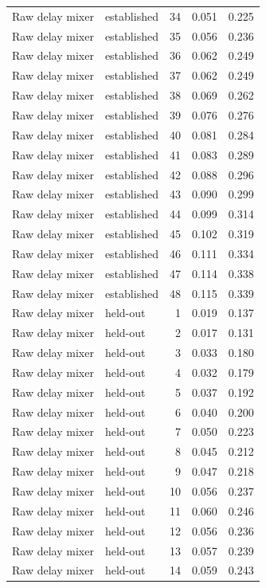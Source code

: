 \begin{tabular}{llrrr}
Raw delay mixer & established & 34 & 0.051 & 0.225 \\
Raw delay mixer & established & 35 & 0.056 & 0.236 \\
Raw delay mixer & established & 36 & 0.062 & 0.249 \\
Raw delay mixer & established & 37 & 0.062 & 0.249 \\
Raw delay mixer & established & 38 & 0.069 & 0.262 \\
Raw delay mixer & established & 39 & 0.076 & 0.276 \\
Raw delay mixer & established & 40 & 0.081 & 0.284 \\
Raw delay mixer & established & 41 & 0.083 & 0.289 \\
Raw delay mixer & established & 42 & 0.088 & 0.296 \\
Raw delay mixer & established & 43 & 0.090 & 0.299 \\
Raw delay mixer & established & 44 & 0.099 & 0.314 \\
Raw delay mixer & established & 45 & 0.102 & 0.319 \\
Raw delay mixer & established & 46 & 0.111 & 0.334 \\
Raw delay mixer & established & 47 & 0.114 & 0.338 \\
Raw delay mixer & established & 48 & 0.115 & 0.339 \\
Raw delay mixer & held-out & 1 & 0.019 & 0.137 \\
Raw delay mixer & held-out & 2 & 0.017 & 0.131 \\
Raw delay mixer & held-out & 3 & 0.033 & 0.180 \\
Raw delay mixer & held-out & 4 & 0.032 & 0.179 \\
Raw delay mixer & held-out & 5 & 0.037 & 0.192 \\
Raw delay mixer & held-out & 6 & 0.040 & 0.200 \\
Raw delay mixer & held-out & 7 & 0.050 & 0.223 \\
Raw delay mixer & held-out & 8 & 0.045 & 0.212 \\
Raw delay mixer & held-out & 9 & 0.047 & 0.218 \\
Raw delay mixer & held-out & 10 & 0.056 & 0.237 \\
Raw delay mixer & held-out & 11 & 0.060 & 0.246 \\
Raw delay mixer & held-out & 12 & 0.056 & 0.236 \\
Raw delay mixer & held-out & 13 & 0.057 & 0.239 \\
Raw delay mixer & held-out & 14 & 0.059 & 0.243 \\

\end{tabular}
